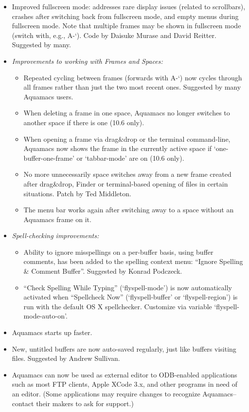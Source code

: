 \begin{itemize}
\item Improved fullscreen mode: addresses rare display issues (related to scrollbars), crashes after switching back from fullscreen mode, and empty menus during fullscreen mode.  Note that multiple frames may be shown in fullscreen mode (switch with, e.g.,  A-`).
Code by Daisuke Murase and David Reitter.  Suggested by many.

\item  \emph{Improvements to working with Frames and Spaces:}
\begin{itemize}
\item Repeated cycling between frames (forwards with A-`) now cycles through all frames rather than just the two most recent ones.
Suggested by many Aquamacs users.
\item When deleting a frame in one space, Aquamacs no longer switches to another space if there is one (10.6 only). 
\item When opening a frame via drag\&drop or the terminal command-line, Aquamacs now shows the frame in the currently active space if `one-buffer-one-frame' or `tabbar-mode' are on (10.6 only). 
\item No more unnecessarily space switches away from a new frame created after drag\&drop, Finder or terminal-based opening of files in certain situations.
Patch by Ted Middleton.
\item The menu bar works again after switching away to a space without an Aquamacs frame on it.
\end{itemize}
\item \emph{Spell-checking improvements:}
\begin{itemize}
\item Ability to ignore misspellings on a per-buffer basis, using buffer comments, has been added to the spelling context menu: ``Ignore Spelling \& Comment Buffer''.  Suggested by Konrad Podczeck.
\item ``Check Spelling While Typing'' (`flyspell-mode') is now automatically activated when ``Spellcheck Now'' (`flyspell-buffer' or `flyspell-region') is run with the default OS X spellchecker.  Customize via variable `flyspell-mode-auto-on'.
\end{itemize}
\item Aquamacs starts up faster.
\item New, untitled buffers are now auto-saved regularly, just like buffers visiting files.
Suggested by Andrew Sullivan.
\item Aquamacs can now be used as external editor to ODB-enabled applications such as most FTP clients, Apple XCode 3.x, and other programs in need of an editor.  (Some applications may require changes to recognize Aquamacs--contact their makers to ask for support.)

\end{itemize}

